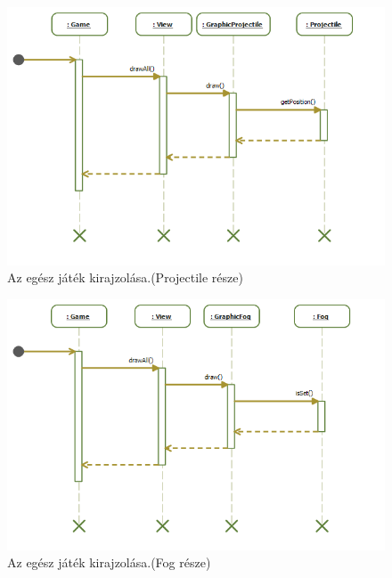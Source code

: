 \begin{figure}[H]
\begin{center}
\includegraphics[width=18cm]{images/grafikaSeq/step5.png}
\caption{Az egész játék kirajzolása.(Projectile része)}
\label{fig:Graphic_drawAll_Projectile}
\end{center}
\end{figure}

\begin{figure}[H]
\begin{center}
\includegraphics[width=18cm]{images/grafikaSeq/step6.png}
\caption{Az egész játék kirajzolása.(Fog része)}
\label{fig:Graphic_drawAll_Fog}
\end{center}
\end{figure}

